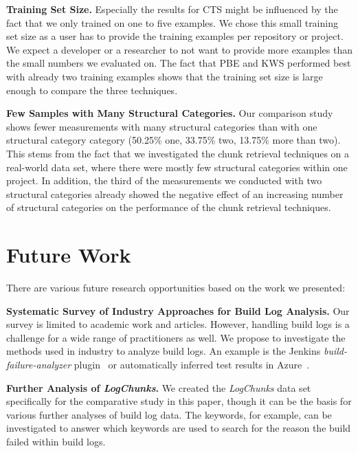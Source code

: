 \textbf{Training Set Size.}
Especially the results for CTS might be influenced by the fact that we
only trained on one to five examples.
We chose this small training set
size as a user has to provide the training examples
per repository or project.
We expect a developer or a researcher
to not want to provide more examples than the
small numbers we evaluated on.
The fact that PBE and KWS performed best with already two training
examples shows that the training set size is large enough to
compare the three techniques.

\textbf{Few Samples with Many Structural Categories.}
Our comparison study shows fewer measurements with many structural
categories than with one structural category category (50.25\% one,
33.75\% two, 13.75\% more than two).
This stems from the fact that we
investigated the chunk retrieval techniques on a real-world data set,
where there were mostly few structural categories within one project.
In addition, the third of the measurements we conducted with two
structural categories already showed the negative effect of an
increasing number of structural categories on the performance of the
chunk retrieval techniques.

\section{Future Work}

There are various future research opportunities based on the
work we presented:

\textbf{Systematic Survey of Industry Approaches for Build
Log Analysis.}
Our survey is limited to academic work and articles.
However, handling build logs is a challenge for a wide range of
practitioners as well.
We propose to investigate the methods used in industry to analyze
build logs.
An example is the Jenkins \emph{build-failure-analyzer}
plugin~\cite{jenkins2020failure-analyzer} or automatically
inferred test results in Azure~\cite{azure2020inferred}.

\textbf{Further Analysis of \emph{LogChunks}.}
We created the
\emph{LogChunks} data set \cite{brandt2020logchunks} specifically for
the comparative
study in this paper, though it can be the basis for various further
analyses of build log data.
The keywords, for example, can be
investigated to answer which keywords are used to search for the
reason the build failed within build logs.


